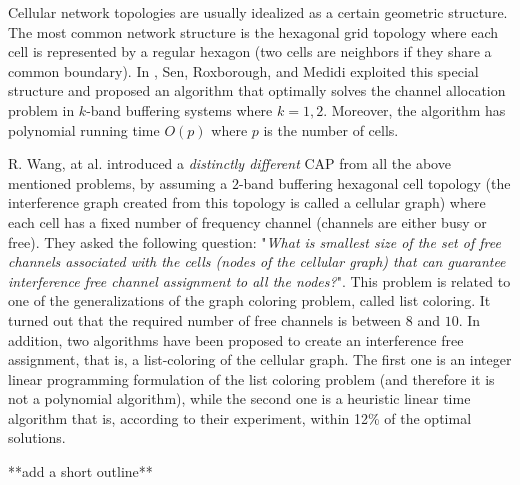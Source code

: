 \documentclass[letterpaper, 10 pt, conference]{ieeeconf}  %
\begin{document}
Cellular network topologies are usually idealized as a certain geometric structure. The most common network structure is the hexagonal grid topology where each cell is represented by a regular hexagon (two cells are neighbors if they share a common boundary). In \cite{662943}, Sen, Roxborough, and Medidi exploited this special structure and proposed an algorithm that optimally solves the channel allocation problem in $k$-band buffering systems where $k=1,2$. Moreover, the algorithm has polynomial running time $O(p)$ where $p$ is the number of cells.

R. Wang, at al. \cite{7248845} introduced a \textit{distinctly different} CAP from all the above mentioned problems, by assuming a $2$-band buffering hexagonal cell topology (the interference graph created from this topology is called a cellular graph) where each cell has a fixed number of frequency channel (channels are either busy or free). They asked the following question: "\textit{What is smallest size of the set of free channels associated with the cells (nodes of the cellular graph) that can guarantee interference free channel assignment to all the nodes?}". This problem is related to one of the generalizations of the graph coloring problem, called list coloring. It turned out that the required number of free channels is between $8$ and $10$. In addition, two algorithms have been proposed to create an interference free assignment, that is, a list-coloring of the cellular graph. The first one is an integer linear programming formulation of the list coloring problem (and therefore it is not a polynomial algorithm), while the second one is a heuristic linear time algorithm that is, according to their experiment, within 12\% of the optimal solutions.

**add a short outline**
\end{document}
